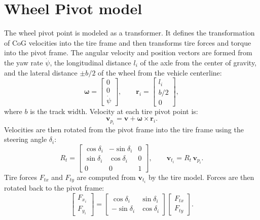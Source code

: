 \section{Wheel Pivot model}
The wheel pivot point is modeled as a transformer. It defines the transformation of CoG velocities into the tire frame and then transforms tire forces and torque into the pivot frame. The angular velocity and position vectors are formed from the yaw rate $\dot{\psi}$, the longitudinal distance $l_i$ of the axle from the center of gravity, and the lateral distance $\pm b/2$ of the wheel from the vehicle centerline:
\begin{equation}
    \symbf{\omega} = \begin{bmatrix} 0 \\ 0 \\ \dot{\psi} \end{bmatrix}, \qquad
    \symbf{r}_i    = \begin{bmatrix} l_i \\ b/2 \\ 0 \end{bmatrix},
\end{equation}
where $b$ is the track width. Velocity at each tire pivot point is:
\begin{equation}
    \symbf{v}_{p_i} = \symbf{v} + \symbf{\omega} \times \symbf{r}_i.
\end{equation}
Velocities are then rotated from the pivot frame into the tire frame using the
steering angle $\delta_i$:
\begin{equation}
    R_t = \begin{bmatrix}
        \cos\delta_i & -\sin\delta_i & 0 \\
        \sin\delta_i &  \cos\delta_i & 0 \\
        0            &  0            & 1
    \end{bmatrix}, \qquad
    \symbf{v}_{t_i} = R_t\,\symbf{v}_{p_i}.
\end{equation}
Tire forces $F_{tx}$ and $F_{ty}$ are computed from $\symbf{v}_{t_i}$ by the tire
model. Forces are then rotated back to the pivot frame:
\begin{equation}
    \begin{bmatrix} F_{x_i} \\ F_{y_i} \end{bmatrix}
    =
    \begin{bmatrix}
         \cos\delta_i & \sin\delta_i \\
        -\sin\delta_i & \cos\delta_i
    \end{bmatrix}
    \begin{bmatrix} F_{tx} \\ F_{ty} \end{bmatrix}.
\end{equation}

